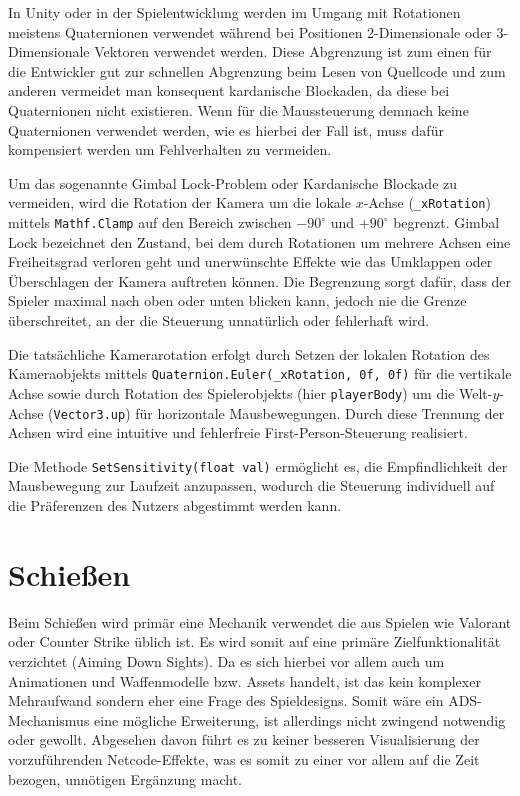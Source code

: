 In Unity oder in der Spielentwicklung werden im Umgang mit Rotationen meistens Quaternionen verwendet während bei Positionen 2-Dimensionale oder 3-Dimensionale Vektoren verwendet werden. Diese Abgrenzung ist zum einen für die Entwickler gut zur schnellen Abgrenzung beim Lesen von Quellcode und zum anderen vermeidet man konsequent kardanische Blockaden, da diese bei Quaternionen nicht existieren. Wenn für die Maussteuerung demnach keine Quaternionen verwendet werden, wie es hierbei der Fall ist, muss dafür kompensiert werden um Fehlverhalten zu vermeiden.

Um das sogenannte {Gimbal Lock}-Problem oder Kardanische Blockade zu vermeiden, wird die Rotation der Kamera um die lokale $x$-Achse (\texttt{\_xRotation}) mittels \texttt{Mathf.Clamp} auf den Bereich zwischen $-90^\circ$ und $+90^\circ$ begrenzt. 
Gimbal Lock bezeichnet den Zustand, bei dem durch Rotationen um mehrere Achsen eine Freiheitsgrad verloren geht und unerwünschte Effekte wie das Umklappen oder Überschlagen der Kamera auftreten können. Die Begrenzung sorgt dafür, dass der Spieler maximal nach oben oder unten blicken kann, jedoch nie die Grenze überschreitet, an der die Steuerung unnatürlich oder fehlerhaft wird.

Die tatsächliche Kamerarotation erfolgt durch Setzen der lokalen Rotation des Kameraobjekts mittels \texttt{Quaternion.Euler(\_xRotation, 0f, 0f)} für die vertikale Achse sowie durch Rotation des Spielerobjekts (hier \texttt{playerBody}) um die Welt-$y$-Achse (\texttt{Vector3.up}) für horizontale Mausbewegungen. Durch diese Trennung der Achsen wird eine intuitive und fehlerfreie First-Person-Steuerung realisiert.

Die Methode \texttt{SetSensitivity(float val)} ermöglicht es, die Empfindlichkeit der Mausbewegung zur Laufzeit anzupassen, wodurch die Steuerung individuell auf die Präferenzen des Nutzers abgestimmt werden kann.



\section{Schießen}
Beim Schießen wird primär eine Mechanik verwendet die aus Spielen wie Valorant oder Counter Strike üblich ist. Es wird somit auf eine primäre Zielfunktionalität verzichtet (Aiming Down Sights).
Da es sich hierbei vor allem auch um Animationen und Waffenmodelle bzw. Assets handelt, ist das kein komplexer Mehraufwand sondern eher eine Frage des Spieldesigns. Somit wäre ein ADS-Mechanismus eine mögliche Erweiterung, ist allerdings nicht zwingend notwendig oder gewollt. Abgesehen davon führt es zu keiner besseren Visualisierung der vorzuführenden Netcode-Effekte, was es somit zu einer vor allem auf die Zeit bezogen, unnötigen Ergänzung macht.

